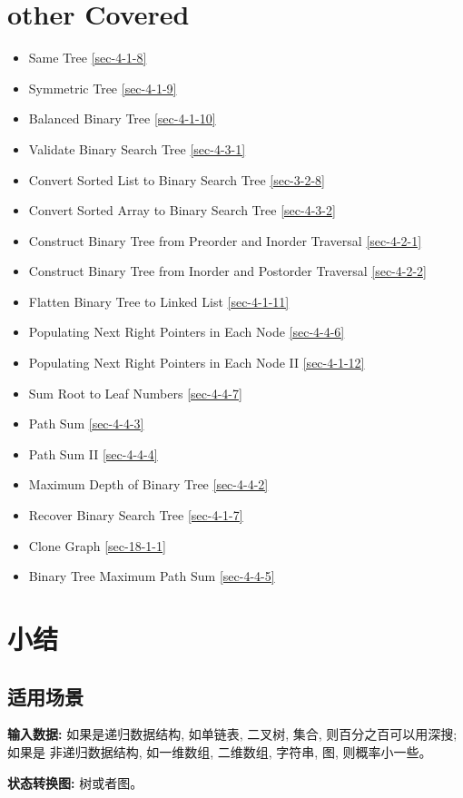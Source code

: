 \documentclass[12pt]{book}
\begin{document}
\section{other Covered}
\label{sec-11-3}
\begin{itemize}
\item Same Tree
\ref{sec-4-1-8}
\item Symmetric Tree
\ref{sec-4-1-9}
\item Balanced Binary Tree
\ref{sec-4-1-10}
\item Validate Binary Search Tree
\ref{sec-4-3-1}
\item Convert Sorted List to Binary Search Tree
\ref{sec-3-2-8}
\item Convert Sorted Array to Binary Search Tree
\ref{sec-4-3-2}
\item Construct Binary Tree from Preorder and Inorder Traversal
\ref{sec-4-2-1}
\item Construct Binary Tree from Inorder and Postorder Traversal
\ref{sec-4-2-2}
\item Flatten Binary Tree to Linked List
\ref{sec-4-1-11}
\item Populating Next Right Pointers in Each Node
\ref{sec-4-4-6}
\item Populating Next Right Pointers in Each Node II
\ref{sec-4-1-12}
\item Sum Root to Leaf Numbers        
\ref{sec-4-4-7}
\item Path Sum
\ref{sec-4-4-3}
\item Path Sum II
\ref{sec-4-4-4}
\item Maximum Depth of Binary Tree
\ref{sec-4-4-2}
\item Recover Binary Search Tree
\ref{sec-4-1-7}
\item Clone Graph
\ref{sec-18-1-1}
\item Binary Tree Maximum Path Sum
\ref{sec-4-4-5}
\end{itemize}
\section{小结}
\label{sec-11-4}
\subsection{适用场景}
\label{sec-11-4-1}
\textbf{输入数据:} 如果是递归数据结构, 如单链表, 二叉树, 集合, 则百分之百可以用深搜;如果是
非递归数据结构, 如一维数组, 二维数组, 字符串, 图, 则概率小一些。

\textbf{状态转换图:} 树或者图。
\end{document}
